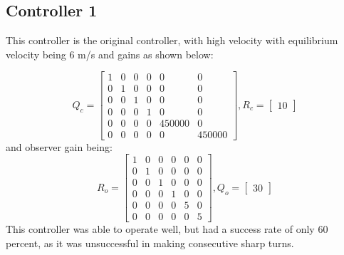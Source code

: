\documentclass{article}
\begin{document}
\subsection{Controller 1}
This controller is the original controller, with high velocity with equilibrium velocity being 6 m/s and gains as shown below:

\begin{equation*}
    Q_{c} = \begin{bmatrix}
    1 & 0 & 0 & 0 & 0& 0\\
    0 & 1 & 0 & 0 & 0 & 0\\
    0 & 0 & 1 & 0 & 0 & 0\\
    0 & 0 & 0 & 1 & 0& 0\\
    0 & 0 & 0 & 0 & 450000& 0\\0&0&0&0&0&450000
    \end{bmatrix} , R_{c} = \begin{bmatrix}
    10
    \end{bmatrix}
\end{equation*}
and observer gain being:
 \begin{equation*}
     R_{o}= \begin{bmatrix}
     1 & 0 & 0 & 0 & 0& 0\\
    0 & 1 & 0 & 0 & 0 & 0\\
    0 & 0 & 1 & 0 & 0 & 0\\
    0 & 0 & 0 & 1 & 0& 0\\
    0 & 0 & 0 & 0 & 5& 0\\0&0&0&0&0&5
    \end{bmatrix} , Q_{o} = \begin{bmatrix}
    30
    \end{bmatrix}
 \end{equation*}
 This controller was able to operate well, but had a success rate of only 60 percent, as it was unsuccessful in making consecutive sharp turns.
\end{document}
